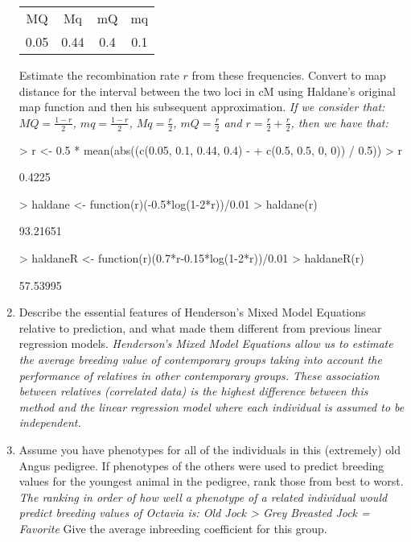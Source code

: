 \documentclass[12pt,a4paper]{paper}
\begin{document}
\begin{enumerate}
\begin{center}
\begin{tabular}{cccc}
MQ&Mq&mQ&mq\\
0.05&0.44&0.4&0.1\\
\end{tabular}
\end{center}
Estimate the recombination rate $r$ from these frequencies. Convert to map distance for the interval between the two loci in cM using Haldane’s original map function and then his subsequent approximation. \textit{If we consider that: $MQ = \frac{1-r}{2}$, $mq =  \frac{1-r}{2}$, $Mq = \frac{r}{2}$, $mQ = \frac{r}{2}$ and $r = \frac{r}{2} + \frac{r}{2}$, then we have that:}
\begin{Schunk}
\begin{Sinput}
> r <- 0.5 * mean(abs((c(0.05, 0.1, 0.44, 0.4) - 
+                        c(0.5, 0.5, 0, 0)) / 0.5))
> r
\end{Sinput}
\begin{Soutput}
[1] 0.4225
\end{Soutput}
\begin{Sinput}
> haldane <- function(r){(-0.5*log(1-2*r))/0.01}
> haldane(r)
\end{Sinput}
\begin{Soutput}
[1] 93.21651
\end{Soutput}
\begin{Sinput}
> haldaneR <- function(r){(0.7*r-0.15*log(1-2*r))/0.01}
> haldaneR(r)
\end{Sinput}
\begin{Soutput}
[1] 57.53995
\end{Soutput}
\end{Schunk}
\item Describe the essential features of Henderson’s Mixed Model Equations relative to prediction, and what made them different from previous linear regression models. \textit{Henderson’s Mixed Model Equations allow us to estimate the average breeding value of contemporary groups taking into account the performance of relatives in other contemporary groups. These association between relatives (correlated data) is the highest difference between this method and the linear regression model where each individual is assumed to be independent.}
\item Assume you have phenotypes for all of the individuals in this (extremely) old Angus pedigree. If phenotypes of the others were used to predict breeding values for the youngest animal in the pedigree, rank those from best to worst. \textit{The ranking in order of how well a phenotype of a related individual would predict breeding values of Octavia is: Old Jock > Grey Breasted Jock = Favorite } Give the average inbreeding coefficient for this group.

\end{enumerate}
\end{document}
